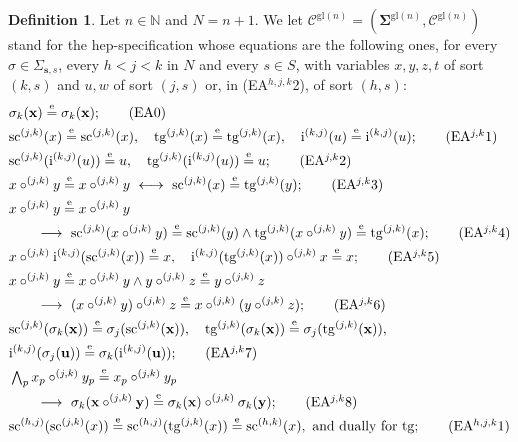 \documentclass[a4paper,reqno]{amsart}
\newcommand{\sig}[1]{\mathbf{#1}}                %
\newcommand{\spec}[1]{\boldsymbol{\mathcal{#1}}} %
\newcommand{\eeq}{\overset{\mathrm e}{=}}        %
\newcommand{\gl}{\mathrm{gl}}
\newcommand{\src}{\mathrm{sc}}
\newcommand{\tgt}{\mathrm{tg}}
\newcommand{\ii}{\mathrm{i}}
\theoremstyle{plain}
\theoremstyle{definition}
\newtheorem{definition}[theorem]{Definition}
\begin{document}
\begin{definition}\label{DSpecGlobular}
Let $n\in\mathbb{N}$ and $N=n+1$.
We let $\spec{C}^{\gl(n)}=(\sig{\Sigma}^{\gl(n)},\mathcal{C}^{\gl(n)})$ stand for the hep-specification whose equations are the following ones, for every $\sigma\in\Sigma_{\mathbf{s},s}$, every $h<j<k$ in $N$ and every $s\in S$, with variables $x,y,z,t$ of sort $(k,s)$ and $u,w$ of sort $(j,s)$ or, in (EA$^{h,j,k}$2), of sort $(h,s)$:
\begin{align*}
&\sigma_{k}(\mathbf{x})\eeq\sigma_{k}(\mathbf{x});
\tag{EA0}\\
&\src^{(j,k)}(x)\eeq\src^{(j,k)}(x),\quad\tgt^{(j,k)}(x)\eeq\tgt^{(j,k)}(x),\quad\ii^{(k,j)}(u)\eeq\ii^{(k,j)}(u);
\tag{EA$^{j,k}$1}\\
&\src^{(j,k)}(\ii^{(k,j)}(u))\eeq u,\quad\tgt^{(j,k)}(\ii^{(k,j)}(u))\eeq u;
\tag{EA$^{j,k}$2}\\
&x\circ^{(j,k)}y\eeq x\circ^{(j,k)}y\ \longleftrightarrow\ \src^{(j,k)}(x)\eeq\tgt^{(j,k)}(y);
\tag{EA$^{j,k}$3}\\
&x\circ^{(j,k)}y\eeq x\circ^{(j,k)}y
\\&\qquad\longrightarrow\ \src^{(j,k)}(x\circ^{(j,k)}y)\eeq\src^{(j,k)}(y)\wedge\tgt^{(j,k)}(x\circ^{(j,k)}y)\eeq\tgt^{(j,k)}(x);
\tag{EA$^{j,k}$4}\\
&x\circ^{(j,k)}\ii^{(k,j)}(\src^{(j,k)}(x))\eeq x,\quad\ii^{(k,j)}(\tgt^{(j,k)}(x))\circ^{(j,k)}x\eeq x;
\tag{EA$^{j,k}$5}\\
&x\circ^{(j,k)}y\eeq x\circ^{(j,k)}y\wedge y\circ^{(j,k)}z\eeq y\circ^{(j,k)}z
\\&\qquad\longrightarrow\ (x\circ^{(j,k)}y)\circ^{(j,k)}z\eeq x\circ^{(j,k)}(y\circ^{(j,k)}z);
\tag{EA$^{j,k}$6}\\
&\src^{(j,k)}(\sigma_{k}(\mathbf{x}))\eeq\sigma_{j}(\src^{(j,k)}(\mathbf{x})),\quad\tgt^{(j,k)}(\sigma_{k}(\mathbf{x}))\eeq\sigma_{j}(\tgt^{(j,k)}(\mathbf{x})),
\\&\ii^{(k,j)}(\sigma_{j}(\mathbf{u}))\eeq\sigma_{k}(\ii^{(k,j)}(\mathbf{u}));
\tag{EA$^{j,k}$7}\\
&\textstyle\bigwedge_{p}x_{p}\circ^{(j,k)}y_{p}\eeq x_{p}\circ^{(j,k)}y_{p}
\\&\qquad\longrightarrow\ \sigma_{k}(\mathbf{x}\circ^{(j,k)}\mathbf{y})\eeq\sigma_{k}(\mathbf{x})\circ^{(j,k)}\sigma_{k}(\mathbf{y});
\tag{EA$^{j,k}$8}\\
&\src^{(h,j)}(\src^{(j,k)}(x))\eeq\src^{(h,j)}(\tgt^{(j,k)}(x))\eeq\src^{(h,k)}(x),\ \text{and dually for $\tgt$};
\tag{EA$^{h,j,k}$1}\\

\end{align*}
\end{definition}
\end{document}

